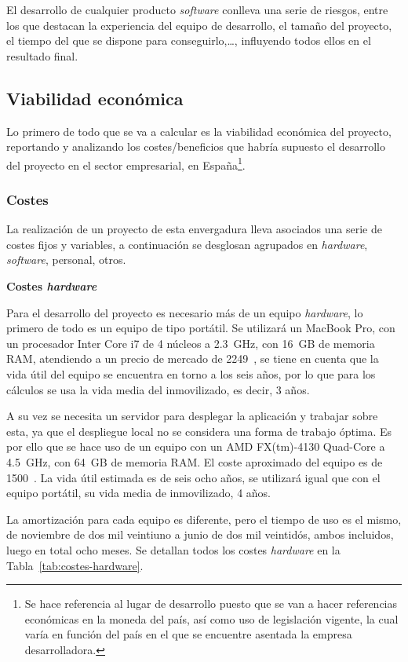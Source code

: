 El desarrollo de cualquier producto \textit{software} conlleva una serie de riesgos, entre los que destacan la experiencia del equipo de desarrollo, el tamaño del proyecto, el tiempo del que se dispone para conseguirlo,\dots, influyendo todos ellos en el resultado final.
\subsection{Viabilidad económica}
Lo primero de todo que se va a calcular es la viabilidad económica del proyecto, reportando y analizando los costes/beneficios que habría supuesto el desarrollo del proyecto en el sector empresarial, en España\footnote{Se hace referencia al lugar de desarrollo puesto que se van a hacer referencias económicas en la moneda del país, así como uso de legislación vigente, la cual varía en función del país en el que se encuentre asentada la empresa desarrolladora.}.

\subsubsection{Costes}
La realización de un proyecto de esta envergadura lleva asociados una serie de costes fijos y variables, a continuación se desglosan agrupados en \textit{hardware}, \textit{software}, personal, otros.

\textbf{Costes \textit{hardware}}

Para el desarrollo del proyecto es necesario más de un equipo \textit{hardware}, lo primero de todo es un equipo de tipo portátil. Se utilizará un MacBook Pro, con un procesador Inter Core i7 de 4 núcleos a 2.3~GHz, con 16~GB de memoria RAM, atendiendo a un precio de mercado de 2249~\officialeuro, se tiene en cuenta que la vida útil del equipo se encuentra en torno a los seis años, por lo que para los cálculos se usa la vida media del inmovilizado, es decir, 3 años. 

A su vez se necesita un servidor para desplegar la aplicación y trabajar sobre esta, ya que el despliegue local no se considera una forma de trabajo óptima. Es por ello que se hace uso de un equipo con un AMD FX(tm)-4130 Quad-Core a 4.5~GHz, con 64~GB de memoria RAM. El coste aproximado del equipo es de 1500~\officialeuro. La vida útil estimada es de seis ocho años, se utilizará igual que con el equipo portátil, su vida media de inmovilizado, 4 años.

La amortización para cada equipo es diferente, pero el tiempo de uso es el mismo, de noviembre de dos mil veintiuno a junio de dos mil veintidós, ambos incluidos, luego en total ocho meses. Se detallan todos los costes \textit{hardware} en la Tabla~\ref{tab:costes-hardware}.

